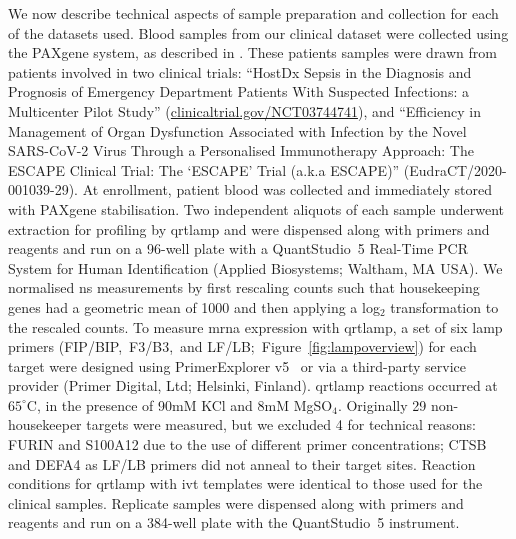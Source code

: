 \documentclass[../thesis.tex]{subfiles}
\begin{document}
We now describe technical aspects of sample preparation and collection for each of the datasets used. Blood samples from our clinical dataset were collected using the PAXgene  system, as described in \citet{ram-mohan_using_2022}. These patients samples were drawn from patients involved in two clinical trials: ``HostDx Sepsis in the Diagnosis and Prognosis of Emergency Department Patients With Suspected Infections: a Multicenter Pilot Study'' (\url{clinicaltrial.gov/NCT03744741}), and ``Efficiency in Management of Organ Dysfunction Associated with Infection by the Novel SARS-CoV-2 Virus Through a Personalised Immunotherapy Approach: The ESCAPE Clinical Trial: The `ESCAPE' Trial (a.k.a ESCAPE)'' (EudraCT/2020-001039-29). At enrollment, patient blood was collected and immediately stored with PAXgene  stabilisation. Two independent aliquots of each sample underwent  extraction for profiling by \gls{qrtlamp} and were dispensed along with primers and reagents and run on a 96-well plate with a QuantStudio\texttrademark~5 Real-Time PCR System for Human Identification (Applied Biosystems; Waltham, MA USA).  We normalised \gls{ns} measurements by first rescaling counts such that housekeeping genes had a geometric mean of 1000 and then applying a \textsf{log}$_{2}$ transformation to the rescaled counts. To measure \gls{mrna} expression with \gls{qrtlamp}, a set of six \gls{lamp} primers (FIP/BIP,~F3/B3,~and  LF/LB;~Figure~\ref{fig:lampoverview}) for each target were designed using PrimerExplorer v5~\citep{eiken_primerexplorer_2019} or via a third-party service provider (Primer Digital, Ltd; Helsinki, Finland). \Gls{qrtlamp} reactions occurred at $65^{\circ}$C, in the presence of 90mM KCl and 8mM MgSO$_4$. Originally 29 non-housekeeper targets were measured, but we excluded 4 for technical reasons: {FURIN} and {S100A12} due to the use of different primer concentrations; {CTSB} and {DEFA4} as LF/LB primers did not anneal to their target sites. Reaction conditions for \gls{qrtlamp} with \gls{ivt}  templates were identical to those used for the clinical samples. Replicate samples were dispensed along with primers and reagents and run on a 384-well plate with the QuantStudio\texttrademark~5 instrument. 

\end{document}
